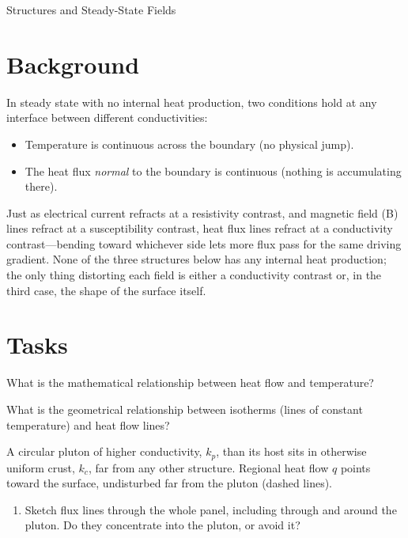 \begin{activity}{Structures and Steady-State Fields}
\section*{Background}
In steady state with no internal heat production, two conditions hold at any interface between different conductivities:
\begin{itemize}
    \item Temperature is continuous across the boundary (no physical jump).
    \item The heat flux \emph{normal} to the boundary is continuous (nothing is accumulating there).
\end{itemize}
Just as electrical current refracts at a resistivity contrast, and magnetic field (B) lines refract at a susceptibility contrast, heat flux lines refract at a conductivity contrast---bending toward whichever side lets more flux pass for the same driving gradient. None of the three structures below has any internal heat production; the only thing distorting each field is either a conductivity contrast or, in the third case, the shape of the surface itself.

\section*{Tasks}
\begin{questions}
What is the mathematical relationship between heat flow and temperature?
\answerbox[2cm]

What is the geometrical relationship between isotherms (lines of constant temperature) and heat flow lines?
\answerbox[2cm]

A circular pluton of higher conductivity, $k_p$, than its host sits in otherwise uniform crust, $k_c$, far from any other structure. Regional heat flow $q$ points toward the surface, undisturbed far from the pluton (dashed lines).

\begin{center}
\end{center}

\begin{enumerate}[label=(\alph*)]
    \item Sketch flux lines through the whole panel, including through and around the pluton. Do they concentrate into the pluton, or avoid it?
    \answerbox[2cm]


\end{enumerate}
\end{questions}
\end{activity}
